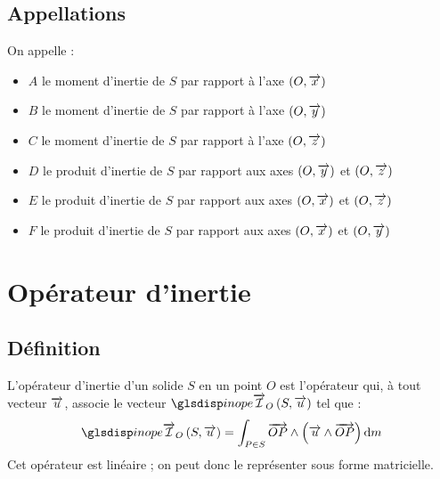	\subsection{Appellations}
	On appelle :
		\begin{itemize}
			\item $A$ le moment d'inertie de $S$ par rapport à l'axe $(O,\overrightarrow{x})$
			\item $B$ le moment d'inertie de $S$ par rapport à l'axe $(O,\overrightarrow{y})$
			\item $C$ le moment d'inertie de $S$ par rapport à l'axe $(O,\overrightarrow{z})$
			\item $D$ le produit d'inertie de $S$ par rapport aux axes $(O,\overrightarrow{y})$ et $(O,\overrightarrow{z})$			
			\item $E$ le produit d'inertie de $S$ par rapport aux axes $(O,\overrightarrow{x})$ et $(O,\overrightarrow{z})$			
			\item $F$ le produit d'inertie de $S$ par rapport aux axes $(O,\overrightarrow{x})$ et $(O,\overrightarrow{y})$			
		\end{itemize}
		
		
\section{Opérateur d'inertie}
	\subsection{Définition}
	L'opérateur d'inertie d'un solide $S$ en un point $O$ est l'opérateur qui, à tout vecteur $\overrightarrow{u}$, associe le vecteur $\inope{S}{\vect{u}}$ tel que :
	\begin{equation}
		\inope{S}{\vect{u}}=\ints{\vect{OP}\wedge\left(\vect{u}\wedge\vect{OP}\right)}
		\label{eq:operateur-intertie}
	\end{equation}
	Cet opérateur est linéaire ; on peut donc le représenter sous forme matricielle.
	
